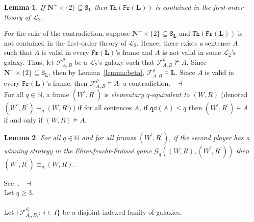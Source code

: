 \documentclass[draft]{article}
\newtheorem{lemma}{Lemma}
\newenvironment{proof}{{\bf Proof:}}{~$\dashv$\\}
\def\N{\mathbb{N}}
\def\qd{\mathtt{qd}}
\def\Th{\mathtt{Th}}
\def\Fr{\mathtt{Fr}}
\def\L{\mathbf{L}}
\def\qd{\mathtt{qd}}
\begin{document}
%
%
\begin{lemma}\label{lemma:delta}
%
%
If $\mathbf{N}^{+}{\times}\{2\}{\subseteq}\mathtt{S}_{\L}$ then $\Th(\Fr(\L))$ is contained in the first-order
%
%
%
%
%
%
%
%
%
%
%
%
\linebreak
%
%
%
%
%
%
%
%
%
%
%
%
theory of ${\mathcal L}_{2}$.
%
%
\end{lemma}
%
%
\begin{proof}
%
%
For the sake of the contradiction, suppose $\mathbf{N}^{+}{\times}\{2\}{\subseteq}\mathtt{S}_{\L}$ and $\Th(\Fr(\L))$ is not contained in the first-order theory of ${\mathcal L}_{2}$.
Hence, there exists a sentence $A$ such that $A$ is valid in every $\Fr(\L)$'s frame and $A$ is not valid in some ${\mathcal L}_{2}$'s galaxy.
Thus, let ${\mathcal F}_{A,B}^{\rho}$ be a ${\mathcal L}_{2}$'s galaxy such that ${\mathcal F}_{A,B}^{\rho}{\not\models}A$.
Since $\mathbf{N}^{+}{\times}\{2\}{\subseteq}\mathtt{S}_{\L}$, then by Lemma~\ref{lemma:beta}, ${\mathcal F}_{A,B}^{\rho}{\models}\L$.
Since $A$ is valid in every $\Fr(\L)$'s frame, then ${\mathcal F}_{A,B}^{\rho}{\models}A$: a contradiction.
%
%
\medskip
%
%
\end{proof}
%
%
For all $q{\in}\N$, a frame $(W^{\prime},R^{\prime})$ is {\it elementary $q$-equivalent to $(W,R)$}\/ (denoted $(W^{\prime},R^{\prime}){\equiv_{q}}(W,R)$) if for all sentences $A$, if $\qd(A){\leq}q$ then $(W^{\prime},R^{\prime}){\models}A$ if and only if $(W,R){\models}A$.
%
%
\begin{lemma}\label{ehrenfeucht:theorem}
%
%
For all $q{\in}\N$ and for all frames $(W^{\prime},R^{\prime})$, if the second player has a winning strategy in the Ehrenfeucht-Fra\"\i ss\'e game ${\mathcal G}_{q}((W,R),(W^{\prime},R^{\prime}))$ then $(W^{\prime},R^{\prime}){\equiv_{q}}(W,R)$.
%
%
\end{lemma}
%
%
\begin{proof}
%
%
See~\cite[Theorem~$2.2.8$ at Page~$18$]{Ebbinghaus:Flum:1999}.
%
%
\medskip
%
%
\end{proof}
%
%
Let $q{\geq}3$.
%
%
\\
\\
%
%
Let $\{{\mathcal F}_{A_{i},B_{i}}^{\rho_{i}}:\ i{\in}I\}$ be a disjoint indexed family of galaxies.
%
%
\end{document}
